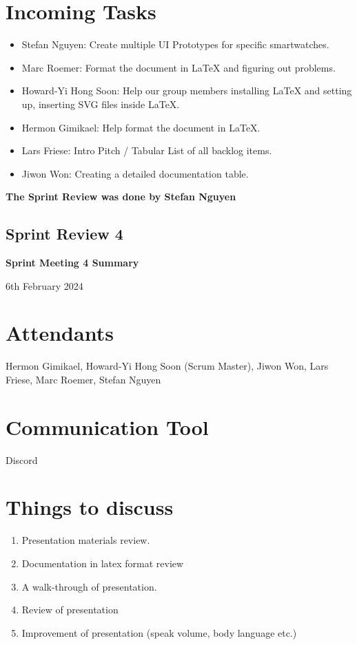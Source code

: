 \documentclass{article}
\begin{document}
\section*{Incoming Tasks}
\begin{itemize}
    \item Stefan Nguyen: Create multiple UI Prototypes for specific smartwatches.
    \item Marc Roemer: Format the document in LaTeX and figuring out problems.
    \item Howard-Yi Hong Soon: Help our group members installing LaTeX and setting up, inserting SVG files inside LaTeX.
    \item Hermon Gimikael: Help format the document in LaTeX.
    \item Lars Friese: Intro Pitch / Tabular List of all backlog items.
    \item Jiwon Won: Creating a detailed documentation table.
\end{itemize}
\noindent
\textbf{The Sprint Review was done by Stefan Nguyen}
\newpage

\subsection{Sprint Review 4}
\begin{center}
    {\Large \textbf{Sprint Meeting 4 Summary}}
    
    \vspace{0.5cm}
    
    {\large 6th February 2024}
\end{center}
\section*{Attendants}
Hermon Gimikael, Howard-Yi Hong Soon (Scrum Master), Jiwon Won, Lars Friese, Marc Roemer, Stefan Nguyen

\section*{Communication Tool}
Discord

\section*{Things to discuss}
\begin{enumerate}
    \item Presentation materials review.
	\item Documentation in latex format review
	\item A walk-through of presentation.
	\item Review of presentation
	\item Improvement of presentation (speak volume, body language etc.)
	
\end{enumerate}
\end{document}
